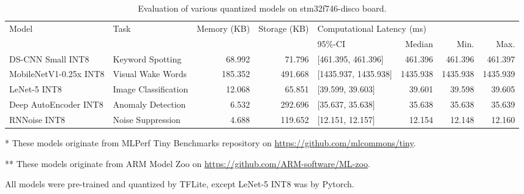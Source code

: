 \begin{table}[ht]
\centering
\begin{threeparttable}
\caption{Evaluation of various quantized models on stm32f746-disco board.}
\label{tab:per-model-eval-result-multimodel}
\begin{tabular}{llrrlrrr}
\hline
\multirow{2}{*}{Model} & \multirow{2}{*}{Task} & \multirow{2}{*}{Memory (KB)} & \multirow{2}{*}{Storage (KB)} & \multicolumn{4}{l}{Computational Latency   (ms)} \\ \cline{5-8}
                       &                       &                              &                               & 95\%-CI      & Median      & Min.     & Max.     \\\hline
DS-CNN   Small INT8\tnote{**}    & Keyword Spotting      &    68.992       &    71.796         &   [461.395, 461.396]  &    461.396         &   461.396       &   461.397       \\
MobileNetV1-0.25x INT8\tnote{*}         & Visual Wake Words     &  185.352      &    491.668         &  [1435.937, 1435.938]  &   1435.938           &  1435.938         &    1435.939      \\
LeNet-5 INT8          & Image Classification  &     12.068      &    65.851             &    [39.599, 39.603]          &   39.601   &   39.598       &   39.605     \\
Deep AutoEncoder INT8\tnote{*}         & Anomaly Detection     &    6.532     &   292.696 & [35.637, 35.638]    &     35.638   &    35.638   &    35.639   \\
RNNoise INT8\tnote{**}           & Noise Suppression     &   4.688       &    119.652        &   [12.151, 12.157]    &   12.154   &   12.148       &   12.160      \\\hline
\end{tabular}
\begin{tablenotes}
\item [*] These models originate from MLPerf Tiny Benchmarks repository on \url{https://github.com/mlcommons/tiny}.
\item [**] These models originate from ARM Model Zoo on \url{https://github.com/ARM-software/ML-zoo}.
\item All models were pre-trained and quantized by TFLite, except LeNet-5 INT8 was by Pytorch.
\end{tablenotes}
\end{threeparttable}
\end{table}

